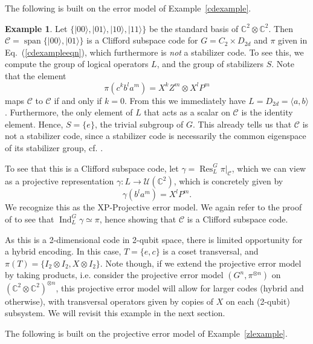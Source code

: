 \documentclass[11pt]{article}
\theoremstyle{definition}
\newtheorem{example}{Example}
\def\ket#1{| #1 \rangle}
\newcommand{\bbC}{\mathbb{C}}
\newcommand{\calC}{\mathcal{C}}
\newcommand{\calU}{\mathcal{U}}
\newcommand{\Ind}{\operatorname{Ind}}
\newcommand{\Res}{\operatorname{Res}}
\newcommand{\Span}{\operatorname{span}}
\begin{document}
The following is built on the error model of Example~\ref{cdexample}. 

\begin{example}\label{nonstabilizer}
    Let $\{ \ket{00},\ket{01}, \ket{10}, \ket{11}\}$ be the standard basis of $\bbC^2 \otimes \bbC^2$. Then $\calC = \Span\{\ket{00}, \ket{01}\}$ is a Clifford subspace code for $G = C_2 \times D_{2d}$ and $\pi$ given in Eq.~(\ref{cdexampleeqn}), which furthermore is \emph{not} a stabilizer code. To see this, we compute the group of logical operators $L$, and the group of stabilizers $S$. Note that the element
    \begin{equation*}
        \pi ( c^k b^l a^m ) = X^kZ^m \otimes X^lP^m
    \end{equation*}
    maps $\calC$ to $\calC$ if and only if $k = 0$. From this we immediately have $L = D_{2d} = \langle a,b \rangle$. Furthermore, the only element of $L$ that acts as a scalar on $\calC$ is the identity element. Hence, $S = \{e\}$, the trivial subgroup of $G$. This already tells us that $\calC$ is not a stabilizer code, since a stabilizer code is necessarily the common eigenspace of its stabilizer group, cf. \cite[Proposition 6.7]{Eidesen2025}.

    To see that this is a Clifford subspace code, let $\gamma = \Res^G_L\pi|_\calC$, which we can view as a projective representation $\gamma \colon L \to \calU(\bbC^2)$, which is concretely given by 
    \begin{equation*}
        \gamma(b^la^m) = X^lP^m.
    \end{equation*}
    We recognize this as the XP-Projective error model. We again refer to the proof of \cite[Proposition 8.1]{Eidesen2025} to see that $\Ind_L^G\gamma \simeq \pi$, hence showing that $\calC$ is a Clifford subspace code.

    As this is a 2-dimensional code in 2-qubit space, there is limited opportunity for a hybrid encoding. In this case, $T = \{e,c\}$ is a coset transversal, and $\pi(T) = \{ I_2 \otimes I_2, X \otimes I_2 \}$. Note though, if we extend the projective error model by taking products, i.e. consider the projective error model $(G^n,\pi^{\otimes n})$ on $(\bbC^2 \otimes \bbC^2)^{\otimes n}$, this projective error model will allow for larger codes (hybrid and otherwise), with transversal operators given by copies of $X$ on each (2-qubit) subsystem. We will revisit this example in the next section. 
\end{example}

The following is built on the projective error model of Example~\ref{zlexample}. 
\end{document}
